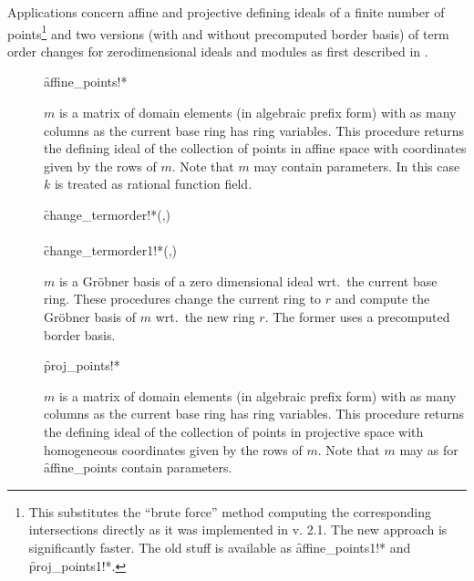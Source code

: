 Applications concern affine and projective defining ideals of a finite
number of points\footnote{This substitutes the ``brute force'' method
computing the corresponding intersections directly as it was
implemented in v. 2.1. The new approach is significantly faster. The
old stuff is available as \f{affine\_points1!*}
and \f{proj\_points1!*}.}
and two versions (with and without precomputed
border basis) of term order
changes for zerodimensional ideals and modules as first described in
\cite{Faugere:93}.
\begin{description}

\item[]
  \begin{syntax}
    \f{affine\_points!*} 
  \end{syntax}
  \hypertarget{procedure:AFFINE_POINTS!*}{}
$m$ is a matrix of domain elements (in algebraic prefix form)
with as many columns as the current base ring has ring variables. This
procedure returns the defining ideal of the collection of points in
affine space with coordinates given by the rows of $m$. Note that $m$
may contain parameters. In this case $k$ is treated as rational
function field.

\item[]
  \begin{syntaxtable}
    \f{change\_termorder!*}(,) \\
    \\
    \f{change\_termorder1!*}(,) \\
  \end{syntaxtable}
  \hypertarget{procedure:CHANGE_TERMORDER!*}{}
  \hypertarget{procedure:CHANGE_TERMORDER1!*}{}
$m$ is a Gr\"obner basis of a zero dimensional ideal wrt.\ the current
base ring. These procedures change the current ring to $r$ and compute
the Gr\"obner basis of $m$ wrt.\ the new ring $r$. The former uses a
precomputed border basis.

\item[]
  \begin{syntax}
    \f{proj\_points!*} 
  \end{syntax}
  \hypertarget{procedure:PROJ_POINTS!*}{}
$m$ is a matrix of domain elements (in algebraic prefix form)
with as many columns as the current base ring has ring variables. This
procedure returns the defining ideal of the collection of points in
projective space with homogeneous coordinates given by the rows of
$m$. Note that $m$ may as for \f{affine\_points} contain
parameters.
\end{description}


